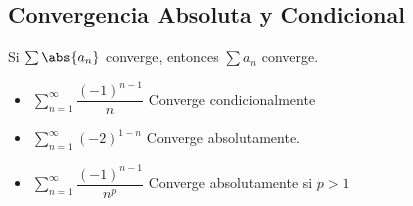 \subsection{Convergencia Absoluta y Condicional}
\begin{frame}
\subsectionpage
\end{frame}


\begin{frame}
  \begin{thm}
    Si $\sum\abs{a_n}$ converge, entonces $\sum a_n$ converge.
  \end{thm}
\end{frame}

\begin{frame}
  \begin{egs}
    \begin{itemize}[<+->]
      \item $\displaystyle\sum_{n=1}^{\infty}\dfrac{(-1)^{n-1}}{n}$ Converge condicionalmente\\
      \vspace{0.5cm}
      \item $\displaystyle\sum_{n=1}^{\infty}(-2)^{1-n}$ Converge absolutamente.\\
      \vspace{0.5cm}
      \item $\displaystyle\sum_{n=1}^{\infty}\dfrac{(-1)^{n-1}}{n^p}$ Converge absolutamente si $p>1$
    \end{itemize}
  \end{egs}
\end{frame}

